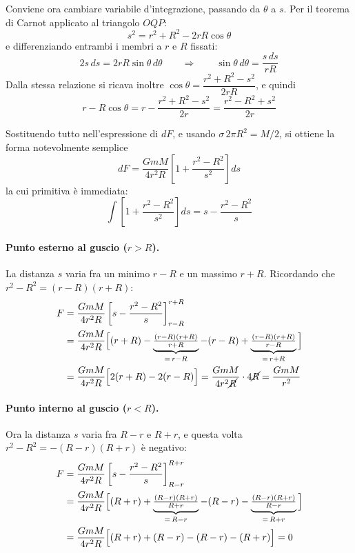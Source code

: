 Conviene ora cambiare variabile d'integrazione, passando da $\theta$ a $s$. Per il teorema di Carnot applicato al triangolo $OQP$:
\begin{equation}
    s^2 = r^2 + R^2 - 2rR\cos\theta
\end{equation}
e differenziando entrambi i membri a $r$ e $R$ fissati:
\begin{equation}
    2s \, ds = 2rR\sin\theta \, d\theta
    \qquad \Longrightarrow \qquad
    \sin\theta \, d\theta = \frac{s \, ds}{rR}
\end{equation}
Dalla stessa relazione si ricava inoltre $\cos\theta = \dfrac{r^2 + R^2 - s^2}{2rR}$, e quindi
\begin{equation}
    r - R\cos\theta = r - \frac{r^2 + R^2 - s^2}{2r} = \frac{r^2 - R^2 + s^2}{2r}
\end{equation}

Sostituendo tutto nell'espressione di $dF$, e usando $\sigma \, 2\pi R^2 = M/2$, si ottiene la forma notevolmente semplice
\begin{equation}
    dF = \frac{G m M}{4 r^2 R} \left[ 1 + \frac{r^2 - R^2}{s^2} \right] ds
\end{equation}
la cui primitiva è immediata:
\begin{equation}
    \int \left[ 1 + \frac{r^2-R^2}{s^2} \right] ds = s - \frac{r^2-R^2}{s}
\end{equation}

\paragraph{Punto esterno al guscio ($r > R$).}
La distanza $s$ varia fra un minimo $r-R$ e un massimo $r+R$. Ricordando che $r^2 - R^2 = (r-R)(r+R)$:
\begin{align}
    F &= \frac{GmM}{4r^2 R} \left[ s - \frac{r^2 - R^2}{s} \right]_{r-R}^{r+R} \notag \\
      &= \frac{GmM}{4r^2 R} \Big[ (r+R) - \underbrace{\tfrac{(r-R)(r+R)}{r+R}}_{=\,r-R}
         - (r-R) + \underbrace{\tfrac{(r-R)(r+R)}{r-R}}_{=\,r+R} \Big] \notag \\
      &= \frac{GmM}{4r^2 R} \Big[ 2(r+R) - 2(r-R) \Big]
       = \frac{GmM}{4r^2 \cancel{R}} \cdot 4\cancel{R}
       = \frac{GmM}{r^2}
\end{align}

\paragraph{Punto interno al guscio ($r < R$).}
Ora la distanza $s$ varia fra $R-r$ e $R+r$, e questa volta $r^2 - R^2 = -(R-r)(R+r)$ è negativo:
\begin{align}
    F &= \frac{GmM}{4r^2 R} \left[ s - \frac{r^2 - R^2}{s} \right]_{R-r}^{R+r} \notag \\
      &= \frac{GmM}{4r^2 R} \Big[ (R+r) + \underbrace{\tfrac{(R-r)(R+r)}{R+r}}_{=\,R-r}
         - (R-r) - \underbrace{\tfrac{(R-r)(R+r)}{R-r}}_{=\,R+r} \Big] \notag \\
      &= \frac{GmM}{4r^2 R} \Big[ (R+r) + (R-r) - (R-r) - (R+r) \Big] = 0
\end{align}

